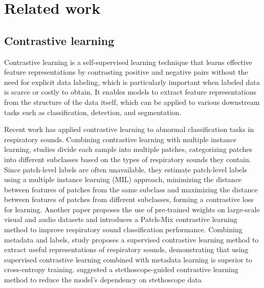 \section{Related work}
\subsection{Contrastive learning}

Contrastive learning is a self-supervised learning technique that learns effective feature representations by contrasting positive and negative pairs without the need for explicit data labeling, which is particularly important when labeled data is scarce or costly to obtain. It enables models to extract feature representations from the structure of the data itself, which can be applied to various downstream tasks such as classification, detection, and segmentation.

Recent work has applied contrastive learning to abnormal classification tasks in respiratory sounds. Combining contrastive learning with multiple instance learning, studies \cite{song2023patch} \cite{song2021contrastive} divide each sample into multiple patches, categorizing patches into different subclasses based on the types of respiratory sounds they contain. Since patch-level labels are often unavailable, they estimate patch-level labels using a multiple instance learning (MIL) approach, minimizing the distance between features of patches from the same subclass and maximizing the distance between features of patches from different subclasses, forming a contrastive loss for learning. Another paper \cite{bae2023patch}  proposes the use of pre-trained weights on large-scale visual and audio datasets and introduces a Patch-Mix contrastive learning method to improve respiratory sound classification performance. Combining metadata and labels, study \cite{moummad2023pretraining} proposes a supervised contrastive learning method to extract useful representations of respiratory sounds, demonstrating that using supervised contrastive learning combined with metadata learning is superior to cross-entropy training. \cite{kim2024stethoscope} suggested a stethoscope-guided contrastive learning method to reduce the model's dependency on stethoscope data



